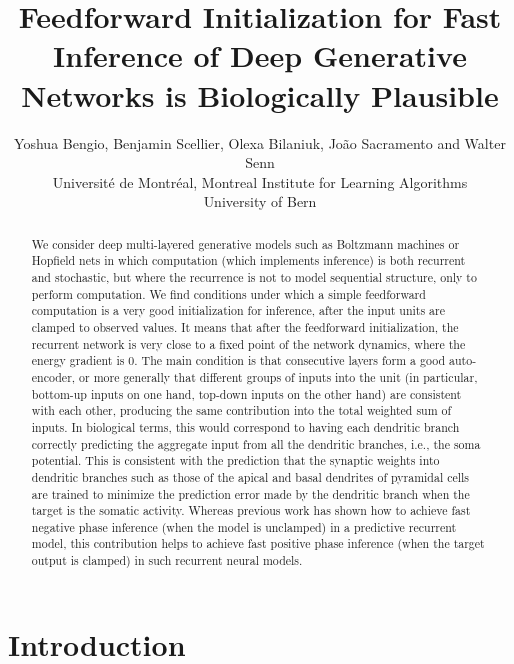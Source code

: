 \documentclass{article}
\title{Feedforward Initialization for Fast Inference of Deep Generative Networks is Biologically Plausible}
\author{
  Yoshua Bengio, Benjamin Scellier, Olexa Bilaniuk, Jo\~{a}o Sacramento and Walter Senn\\
  Universit\'{e} de Montr\'{e}al, Montreal Institute for Learning Algorithms\\
  University of Bern\\
}
\begin{document}
\maketitle



\begin{abstract}
  We consider deep multi-layered generative models such as Boltzmann machines or Hopfield nets in which computation (which implements inference) is both recurrent and stochastic, but where the recurrence is not to model sequential structure, only to perform computation. We find conditions under which a simple feedforward computation is a very good initialization for inference, after the input units are clamped to observed values. It means that after the feedforward initialization, the recurrent network is very close to a fixed point of the network dynamics, where the energy gradient is 0. The main condition is that consecutive layers form a good auto-encoder, or more generally that different groups of inputs into the unit (in particular, bottom-up inputs on one hand, top-down inputs on the other hand) are consistent with each other, producing the same contribution into the total weighted sum of inputs. In biological terms, this would correspond to having each dendritic branch correctly predicting the aggregate input from all the dendritic branches, i.e., the soma potential. This is consistent with the prediction that the synaptic weights into dendritic branches such as those of the apical and basal dendrites of pyramidal cells are trained to minimize the prediction error made by the dendritic branch when the target is the somatic activity. Whereas previous work has shown how to achieve fast negative phase inference (when the model is unclamped) in a predictive recurrent model, this contribution helps to achieve fast positive phase inference (when the target output is clamped) in such recurrent neural models.
\end{abstract}

\section{Introduction}
\end{document}
